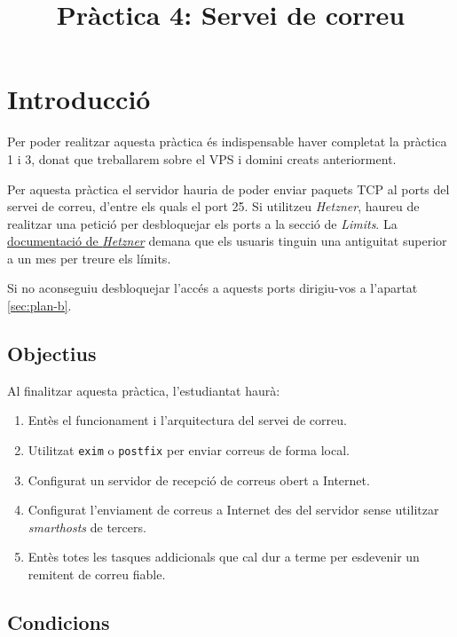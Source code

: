 \documentclass{practicaitic}
\title{Pràctica 4: Servei de correu}
\begin{document}
\section{Introducció}

Per poder realitzar aquesta pràctica és indispensable haver completat la
pràctica 1 i 3, donat que treballarem sobre el VPS i domini creats anteriorment.

\begin{tcolorbox}[
  title=Atenció,
  colback=red!10, colframe=red!50,
  rounded corners
]
Per aquesta pràctica el servidor hauria de poder enviar paquets TCP al 
ports del servei de correu, d'entre els quals el port 25. Si utilitzeu
\textit{Hetzner}, haureu de realitzar una petició
per desbloquejar els ports a la secció de \textit{Limits}.
La \href{https://docs.hetzner.com/robot/dedicated-server/faq/faq#why-can-i-not-send-any-mails-from-my-server}{documentació de \textit{Hetzner}} demana que els usuaris tinguin una
antiguitat superior a un mes per treure els límits.
\newline

Si no aconseguiu desbloquejar l'accés a aquests ports dirigiu-vos a
l'apartat \ref{sec:plan-b}.
\end{tcolorbox}

\subsection{Objectius}

Al finalitzar aquesta pràctica, l'estudiantat haurà:
\begin{enumerate}
  \item Entès el funcionament i l'arquitectura del servei de correu.
  \item Utilitzat \texttt{exim} o \texttt{postfix} per enviar correus de forma local.
  \item Configurat un servidor de recepció de correus obert a Internet.
  \item Configurat l'enviament de correus a Internet des del servidor sense
  utilitzar \textit{smarthosts} de tercers.
  \item Entès totes les tasques addicionals que cal dur a terme per
  esdevenir un remitent de correu fiable.
\end{enumerate}

\subsection{Condicions}
\end{document}
